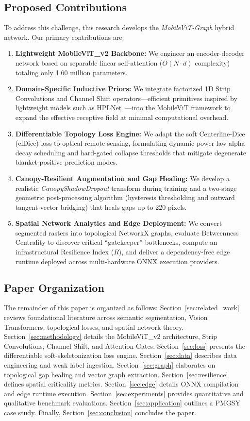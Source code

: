 \documentclass[conference]{IEEEtran}
\begin{document}
\subsection{Proposed Contributions}
To address this challenge, this research develops the \textit{MobileViT-Graph} hybrid network. Our primary contributions are:
\begin{enumerate}
    \item \textbf{Lightweight MobileViT\_v2 Backbone:} We engineer an encoder-decoder network based on separable linear self-attention ($O(N \cdot d)$ complexity) totaling only 1.60 million parameters.
    \item \textbf{Domain-Specific Inductive Priors:} We integrate factorized 1D Strip Convolutions and Channel Shift operators—efficient primitives inspired by lightweight models such as HPLNet~\cite{hplnet2025}—into the MobileViT framework to expand the effective receptive field at minimal computational overhead.
    \item \textbf{Differentiable Topology Loss Engine:} We adapt the soft Centerline-Dice (clDice) loss to optical remote sensing, formulating dynamic power-law alpha decay scheduling and hard-gated collapse thresholds that mitigate degenerate blanket-positive prediction modes.
    \item \textbf{Canopy-Resilient Augmentation and Gap Healing:} We develop a realistic \textit{CanopyShadowDropout} transform during training and a two-stage geometric post-processing algorithm (hysteresis thresholding and outward tangent vector bridging) that heals gaps up to 220 pixels.
    \item \textbf{Spatial Network Analytics and Edge Deployment:} We convert segmented rasters into topological NetworkX graphs, evaluate Betweenness Centrality to discover critical ``gatekeeper'' bottlenecks, compute an infrastructural Resilience Index ($R$), and deliver a dependency-free edge runtime deployed across multi-hardware ONNX execution providers.
\end{enumerate}

\subsection{Paper Organization}
The remainder of this paper is organized as follows: Section~\ref{sec:related_work} reviews foundational literature across semantic segmentation, Vision Transformers, topological losses, and spatial network theory. Section~\ref{sec:methodology} details the MobileViT\_v2 architecture, Strip Convolutions, Channel Shift, and Attention Gates. Section~\ref{sec:loss} presents the differentiable soft-skeletonization loss engine. Section~\ref{sec:data} describes data engineering and weak label ingestion. Section~\ref{sec:graph} elaborates on topological gap healing and vector graph extraction. Section~\ref{sec:resilience} defines spatial criticality metrics. Section~\ref{sec:edge} details ONNX compilation and edge runtime execution. Section~\ref{sec:experiments} provides quantitative and qualitative benchmark evaluations. Section~\ref{sec:application} outlines a PMGSY case study. Finally, Section~\ref{sec:conclusion} concludes the paper.
\end{document}

